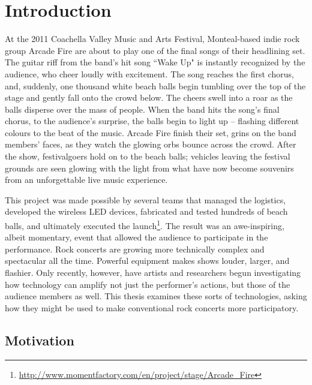 \chapter{Introduction}

At the 2011 Coachella Valley Music and Arts Festival, Monteal-based indie rock group Arcade Fire are about to play one of the final songs of their headlining set. The guitar riff from the band's hit song ``Wake Up" is instantly recognized by the audience, who cheer loudly with excitement. The song reaches the first chorus, and, suddenly, one thousand white beach balls begin tumbling over the top of the stage and gently fall onto the crowd below. The cheers swell into a roar as the balls disperse over the mass of people. When the band hits the song's final chorus, to the audience's surprise, the balls begin to light up -- flashing different colours to the beat of the music. Arcade Fire finish their set, grins on the band members' faces, as they watch the glowing orbs bounce across the crowd. After the show, festivalgoers hold on to the beach balls; vehicles leaving the festival grounds are seen glowing with the light from what have now become souvenirs from an unforgettable live music experience.

This project was made possible by several teams that managed the logistics, developed the wireless LED devices, fabricated and tested hundreds of beach balls, and ultimately executed the launch\footnote{\url{http://www.momentfactory.com/en/project/stage/Arcade_Fire}}. The result was an awe-inspiring, albeit momentary, event that allowed the audience to participate in the performance. Rock concerts are growing more technically complex and spectacular all the time. Powerful equipment makes shows louder, larger, and flashier. Only recently, however, have artists and researchers begun investigating how technology can amplify not just the performer's actions, but those of the audience members as well. This thesis examines these sorts of technologies, asking how they might be used to make conventional rock concerts more participatory.


\section{Motivation}


